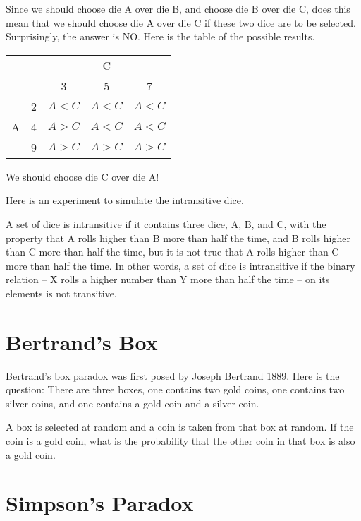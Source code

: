 Since we should choose die A over die B, and choose die B over die C, does this mean that we should choose die A over die C if these two dice are to be selected. Surprisingly, the answer is NO. Here is the table of the possible results.
\begin{center}
  \begin{tabular}{cc|ccc}\hline
    &   & \multicolumn{3}{c}{C} \\
    &   & 3                & 5                & 7                \\ \hline
    \multirow{3}{*}{A}
    & 2 & $A<C$            & $A<C$            & $A<C$            \\
    & 4 & \color{red}$A>C$ & $A<C$            & $A<C$            \\
    & 9 & \color{red}$A>C$ & \color{red}$A>C$ & \color{red}$A>C$ \\\hline
  \end{tabular}
\end{center}
We should choose die C over die A!

Here is an experiment to simulate the intransitive dice.



A set of dice is intransitive if it contains three dice, A, B, and C, with the property that A rolls higher than B more than half the time, and B rolls higher than C more than half the time, but it is not true that A rolls higher than C more than half the time. In other words, a set of dice is intransitive if the binary relation – X rolls a higher number than Y more than half the time – on its elements is not transitive.

\hypertarget{Bertrand-Box}{%
\section{Bertrand's Box}\label{Bertrand-Box}}

Bertrand's box paradox was first posed by Joseph Bertrand 1889. Here is the
question: There are three boxes, one contains two gold coins, one contains two
silver coins, and one contains a gold coin and a silver coin.

A box is selected at random and a coin is taken from that box at random. If the
coin is a gold coin, what is the probability that the other coin in that box is
also a gold coin.




\hypertarget{simpsons-paradox}{%
\section{Simpson's Paradox}\label{simpsons-paradox}}

